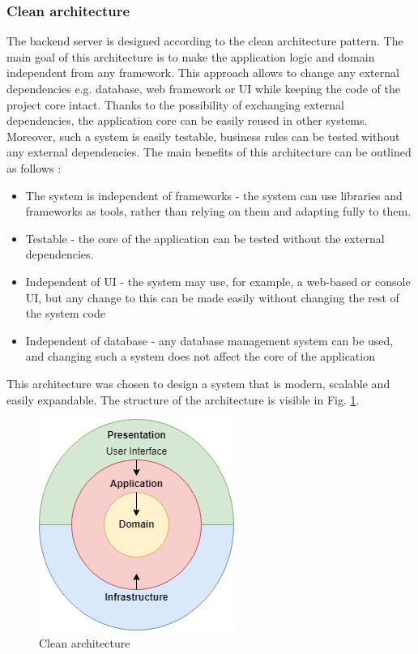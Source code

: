 \documentclass[a4paper,twoside,12pt]{book}
\begin{document}
\subsubsection{Clean architecture}
The backend server is designed according to the clean architecture pattern. The main goal of this architecture is to make the application logic and domain independent from any framework. This approach allows to change any external dependencies e.g. database, web framework or UI while keeping the code of the project core intact. Thanks to the possibility of exchanging external dependencies, the application core can be easily reused in other systems. Moreover, such a system is easily testable, business rules can be tested without any external dependencies.  
The main benefits of this architecture can be outlined as follows \cite{bib:cleanArchitecture}:
\begin{itemize}
\item The system is independent of frameworks - the system can use libraries and frameworks as tools, rather than relying on them and adapting fully to them.
\item Testable - the core of the application can be tested without the external dependencies.
\item Independent of UI - the system may use, for example, a web-based or console UI, but any change to this can be made easily without changing the rest of the system code
\item Independent of database - any database management system can be used, and changing such a system does not affect the core of the application
\end{itemize}
This architecture was chosen to design a system that is modern, scalable and easily expandable.
The structure of the architecture is visible in Fig. \ref{fig:cleanArchitecture}.

\begin{figure}
\centering
\includegraphics[scale=1]{images/cleanArchitecture.drawio.png}
\caption{Clean architecture}
\label{fig:cleanArchitecture}
\end{figure}
\end{document}
